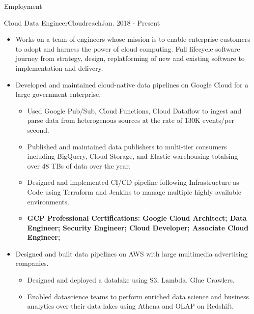 \documentclass[]{mcdowellcv}
\begin{document}
    \makeheader

    \begin{cvsection}{Employment}


        \begin{cvsubsection}{Cloud Data Engineer}{Cloudreach}{Jan. 2018 - Present}
            \begin{itemize}
                \item Works on a team of engineers whose mission is to enable enterprise customers to adopt and harness the power of cloud computing. Full lifecycle software journey from strategy, design, replatforming of new and existing software to implementation and delivery. 
                \item Developed and maintained cloud-native data pipelines on Google Cloud for a large government enterprise.
                    \begin{itemize}
                            \item Used Google Pub/Sub, Cloud Functions, Cloud Dataflow to ingest and parse data from heterogenous sources at the rate of 130K events/per second. 
                            \item Published and maintained data publishers to multi-tier consumers including BigQuery, Cloud Storage, and Elastic warehousing totalsing over 48 TBs of data over the year. 
                            \item Designed and implemented CI/CD pipeline following Infrastructure-as-Code using Terraform and Jenkins to manage multiple highly available environments. 
                            \item \bf{GCP Professional Certifications}: Google Cloud Architect; Data Engineer; \newline Security Engineer; Cloud Developer; Associate Cloud Engineer;\newline 
                    \end{itemize}
                \end{itemize}
                \begin{itemize}
                    \item Designed and built data pipelines on AWS with large multimedia advertising companies.
                    \begin{itemize}
                        \item Designed and deployed a datalake using S3, Lambda, Glue Crawlers. 
                        \item Enabled datascience teams to perform enriched data science and business analytics over their data lakes using Athena and OLAP on Redshift.

\end{itemize}
\end{itemize}
\end{cvsubsection}
\end{cvsection}
\end{document}
